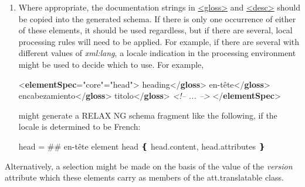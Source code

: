 \begin{enumerate}
\item Where appropriate, the documentation strings in \hyperref[TEI.gloss]{<gloss>} and \hyperref[TEI.desc]{<desc>} should be copied into the generated schema. If there is only one occurrence of either of these elements, it should be used regardless, but if there are several, local processing rules will need to be applied. For example, if there are several with different values of {\itshape xml:lang}, a locale indication in the processing environment might be used to decide which to use. For example, \par\bgroup{}\exampleFont \begin{shaded}\noindent\mbox{}{<\textbf{elementSpec}\hspace*{1em}{module}="{core}"\hspace*{1em}{ident}="{head}">}\mbox{}\newline 
{}\mbox{}\newline 
{}heading{</\textbf{gloss}>}\mbox{}\newline 
{}en-tête{</\textbf{gloss}>}\mbox{}\newline 
{}encabezamiento{</\textbf{gloss}>}\mbox{}\newline 
{}titolo{</\textbf{gloss}>}\mbox{}\newline 
\textit{<!-- ... -->}\mbox{}\newline 
{</\textbf{elementSpec}>}\end{shaded}\egroup\par  might generate a RELAX NG schema fragment like the following, if the locale is determined to be French: \par\hfill\bgroup\exampleFont\vskip 10pt\begin{shaded}
\obeyspaces head =\newline
  \#\# en-tête\newline
  element head ❴ head.content, head.attributes ❵\end{shaded}
\par\egroup 

\end{enumerate} Alternatively, a selection might be made on the basis of the value of the {\itshape version} attribute which these elements carry as members of the \textsf{att.translatable} class.\par
